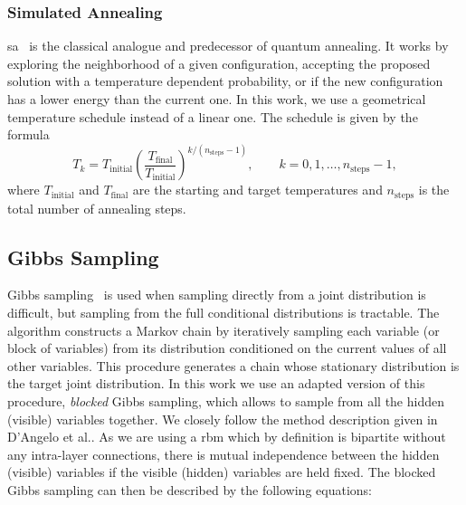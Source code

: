 \documentclass[10pt,a4paper]{article}
\numberwithin{equation}{section}
\begin{document}
\subsubsection{Simulated Annealing}
\Gls{sa}~\cite{Kirkpatrick_1983} is the classical analogue and predecessor of quantum annealing. It works by exploring the neighborhood of a given configuration, accepting the proposed solution with a temperature dependent probability, or if the new configuration has a lower energy than the current one. In this work, we use a geometrical temperature schedule\cite{YANG201467} instead of a linear one. The schedule is given by the formula
\begin{equation}
T_k = T_{\text{initial}}\left(\frac{T_{\text{final}}}{T_{\text{initial}}}\right)^{k/(n_{\text{steps}}-1)},\qquad k = 0, 1, \dots, n_{\text{steps}}-1,
\end{equation}
where $T_{\text{initial}}$ and $T_{\text{final}}$ are the starting and target temperatures and $n_{\text{steps}}$ is the total number of annealing steps.

\subsection{Gibbs Sampling}
\label{sec:gibbs}
Gibbs sampling~\cite{Geman_1984} is used when sampling directly from a joint distribution is difficult, but sampling from the full conditional distributions is tractable. The algorithm constructs a Markov chain by iteratively sampling each variable (or block of variables) from its distribution conditioned on the current values of all other variables. This procedure generates a chain whose stationary distribution is the target joint distribution. In this work we use an adapted version of this procedure, \textit{blocked} Gibbs sampling, which allows to sample from all the hidden (visible) variables together. We closely follow the method description given in D'Angelo et al.\cite{PhysRevResearch.2.023266}. As we are using a \gls{rbm} which by definition is bipartite without any intra-layer connections, there is  mutual independence between the hidden (visible) variables if the visible (hidden) variables are held fixed. The blocked Gibbs sampling can then be described by the following equations:
\end{document}
